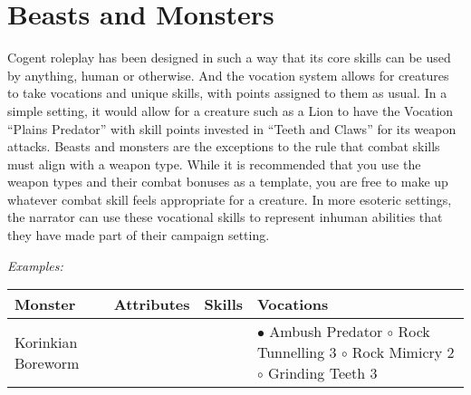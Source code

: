 \section{Beasts and Monsters}

Cogent roleplay has been designed in such a way that its core skills can be used by anything, human or otherwise. And the vocation system allows for creatures to take vocations and unique skills, with points assigned to them as usual. In a simple setting, it would allow for a creature such as a Lion to have the Vocation “Plains Predator” with skill points invested in “Teeth and Claws” for its weapon attacks. Beasts and monsters are the exceptions to the rule that combat skills must align with a weapon type. While it is recommended that you use the weapon types and their combat bonuses as a template, you are free to make up whatever combat skill feels appropriate for a creature. In more esoteric settings, the narrator can use these vocational skills to represent inhuman abilities that they have made part of their campaign setting.

\textit{Examples:}

\begin{center}
    \begin{tabular}{|p{} p{} p{} p{}|} 
        \hline 
        \textbf{Monster} & \textbf{Attributes} & \textbf{Skills} & \textbf{Vocations} \\ 
        \hline
        Korinkian Boreworm & & & 
            $\bullet$ Ambush Predator \newline
            \hspace*{.7em} $\circ$ Rock Tunnelling 3 \newline
            \hspace*{.7em} $\circ$ Rock Mimicry 2 \newline
            \hspace*{.7em} $\circ$ Grinding Teeth 3 \\
        \hline
    \end{tabular}
\end{center}